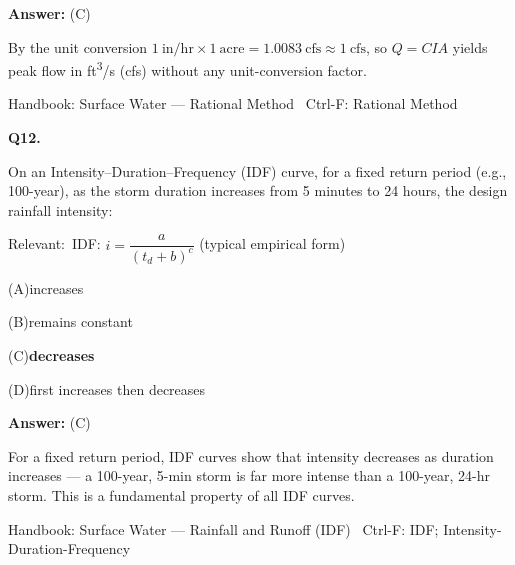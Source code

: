 \documentclass[11pt]{article}
\newcommand{\correct}[1]{\textbf{#1}\;{\color{accent}$\checkmark$}}
\newcommand{\optline}[2]{\par\noindent\hspace{1.2em}(#1)\hspace{0.6em}#2}
\begin{document}
\vspace{2pt}\par\noindent\colorbox{boxbg}{\parbox{\dimexpr\linewidth-2\fboxsep\relax}{%
\vspace{2pt}\textbf{Answer:} (C)\par\vspace{2pt}
{\small By the unit conversion $1\ \mathrm{in/hr} \times 1\ \mathrm{acre} = 1.0083\ \mathrm{cfs} \approx 1\ \mathrm{cfs}$, so $Q = CIA$ yields peak flow in ft\textsuperscript{3}/s (cfs) without any unit-conversion factor.}\par\vspace{2pt}
{\footnotesize\color{soft}Handbook: Surface Water --- Rational Method \textbullet\ Ctrl-F: Rational Method}\vspace{2pt}
}}
\vspace{9pt}
\filbreak
\textbf{\color{accent}Q12.}\par\vspace{2pt}
On an Intensity--Duration--Frequency (IDF) curve, for a fixed return period (e.g., 100-year), as the storm duration increases from 5 minutes to 24 hours, the design rainfall intensity:\par\vspace{3pt}
{\small\color{soft}Relevant:}\ IDF: $i = \dfrac{a}{(t_d + b)^{c}}$ (typical empirical form)\par\vspace{3pt}
\optline{A}{increases}
\optline{B}{remains constant}
\optline{C}{\correct{decreases}}
\optline{D}{first increases then decreases}
\par\vspace{3pt}
\vspace{2pt}\par\noindent\colorbox{boxbg}{\parbox{\dimexpr\linewidth-2\fboxsep\relax}{%
\vspace{2pt}\textbf{Answer:} (C)\par\vspace{2pt}
{\small For a fixed return period, IDF curves show that intensity decreases as duration increases --- a 100-year, 5-min storm is far more intense than a 100-year, 24-hr storm. This is a fundamental property of all IDF curves.}\par\vspace{2pt}
{\footnotesize\color{soft}Handbook: Surface Water --- Rainfall and Runoff (IDF) \textbullet\ Ctrl-F: IDF; Intensity-Duration-Frequency}\vspace{2pt}
}}
\end{document}
